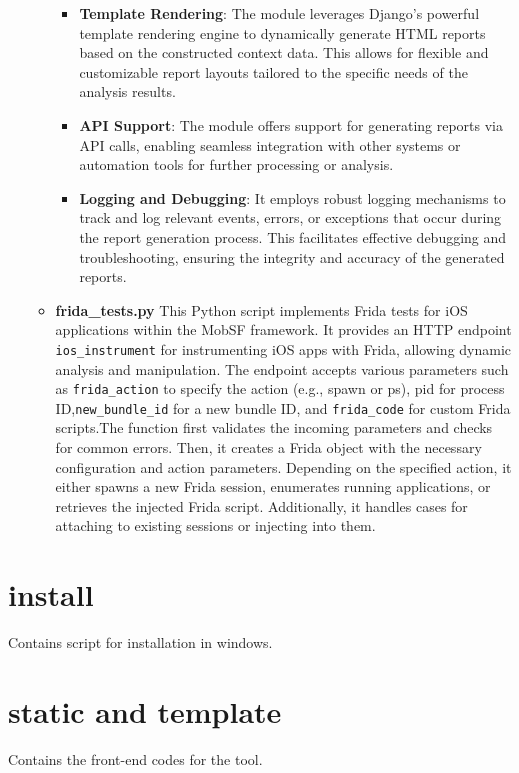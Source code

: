 \documentclass{report}
\begin{document}
\begin{itemize}
\begin{itemize}
\begin{itemize}
            \item \textbf{Template Rendering}: The module leverages Django's powerful template rendering engine to dynamically generate HTML reports based on the constructed context data. This allows for flexible and customizable report layouts tailored to the specific needs of the analysis results.
            
            \item \textbf{API Support}: The module offers support for generating reports via API calls, enabling seamless integration with other systems or automation tools for further processing or analysis.
            
            \item \textbf{Logging and Debugging}: It employs robust logging mechanisms to track and log relevant events, errors, or exceptions that occur during the report generation process. This facilitates effective debugging and troubleshooting, ensuring the integrity and accuracy of the generated reports.
        \end{itemize}

        \item \textbf{frida\_tests.py}
        This Python script implements Frida tests for iOS applications within the MobSF framework. It provides an HTTP endpoint \texttt{ios\_instrument} for instrumenting iOS apps with Frida, allowing dynamic analysis and manipulation. The endpoint accepts various parameters such as \texttt{frida\_action} to specify the action (e.g., spawn or ps), pid for process ID,\texttt{new\_bundle\_id} for a new bundle ID, and \texttt{frida\_code} for custom Frida scripts.The function first validates the incoming parameters and checks for common errors. Then, it creates a Frida object with the necessary configuration and action parameters. Depending on the specified action, it either spawns a new Frida session, enumerates running applications, or retrieves the injected Frida script. Additionally, it handles cases for attaching to existing sessions or injecting into them.
        


        
    \end{itemize}
\end{itemize}
\section{install}
Contains script for installation in windows.

\section{static and template}
Contains the front-end codes for the tool.
\end{document}
